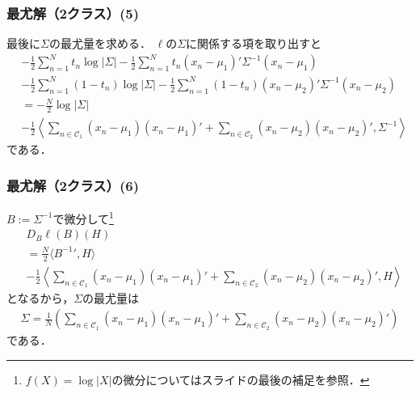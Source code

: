 \documentclass[10pt,%
hyperref={unicode}]{beamer}
\begin{document}
\begin{frame}
    \frametitle{最尤解（2クラス）(5)}
    最後に$\varSigma$の最尤量を求める．
    $\ell$の$\varSigma$に関係する項を取り出すと
    \begin{align*}
        &- \frac{1}{2}\sum_{n = 1}^N t_n \log |\varSigma|
        - \frac{1}{2} \sum_{n = 1}^N t_n (x_n - \mu_1)' \varSigma^{-1}(x_n - \mu_1)
        \\
        &- \frac{1}{2}\sum_{n = 1}^N (1 - t_n) \log |\varSigma|
        - \frac{1}{2} \sum_{n = 1}^N (1 - t_n) (x_n - \mu_2)' \varSigma^{-1}(x_n - \mu_2)
        \\
        &= -\frac{N}{2}\log |\varSigma| \\
        & - \frac{1}{2}\left\langle \sum_{n \in \mathcal{C}_1} (x_n - \mu_1)(x_n - \mu_1)' +
        \sum_{n \in \mathcal{C}_2} (x_n - \mu_2)(x_n - \mu_2)',
        \varSigma^{-1}\right\rangle
    \end{align*}
    である．
\end{frame}

\begin{frame}
    \frametitle{最尤解（2クラス）(6)}
    $B := \varSigma^{-1}$で微分して\footnote{$f(X) = \log |X|$の微分についてはスライドの最後の補足を参照．}
\begin{align*}
    &D_B \ell (B)(H) \\
    &= \frac{N}{2}\langle B^{-1}{}', H \rangle \\
    &- \frac{1}{2}\left\langle \sum_{n \in \mathcal{C}_1} (x_n - \mu_1)(x_n - \mu_1)' + \sum_{n \in \mathcal{C}_2} (x_n - \mu_2)(x_n - \mu_2)',H \right\rangle
\end{align*}
となるから，$\varSigma$の最尤量は
\begin{align*}
    \varSigma = \frac{1}{N}\left(\sum_{n \in \mathcal{C}_1}
        (x_n - \mu_1)(x_n - \mu_1)'
    +\sum_{n \in \mathcal{C}_2} (x_n - \mu_2)(x_n - \mu_2)'\right)
\end{align*}
である．
\end{frame}
\end{document}
